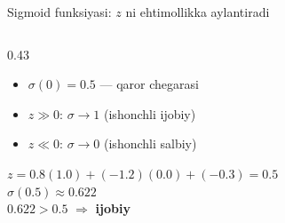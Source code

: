 \documentclass[aspectratio=169,11pt]{beamer}
\begin{document}
\begin{frame}{Sigmoid funksiyasi: $z$ ni ehtimollikka aylantiradi}
\begin{columns}[T]
\begin{column}{0.43\textwidth}
\begin{itemize}
        \item $\sigma(0)=0.5$ --- qaror chegarasi
        \item $z\gg0$:\; $\sigma\to1$ (ishonchli ijobiy)
        \item $z\ll0$:\; $\sigma\to0$ (ishonchli salbiy)
      \end{itemize}
      \vspace{6pt}
      \begin{tcolorbox}[defbox,title={$[I]$-slayd misolidan}]
        \footnotesize
        $z=0.8(1.0)+(-1.2)(0.0)+(-0.3)=0.5$\\[3pt]
        $\sigma(0.5)\approx\mathbf{0.622}$\\[2pt]
        $0.622>0.5$
        $\Rightarrow$ \textcolor{deepgreen}{\textbf{ijobiy}}
      \end{tcolorbox}
    \end{column}
  \end{columns}
\end{frame}
\end{document}
